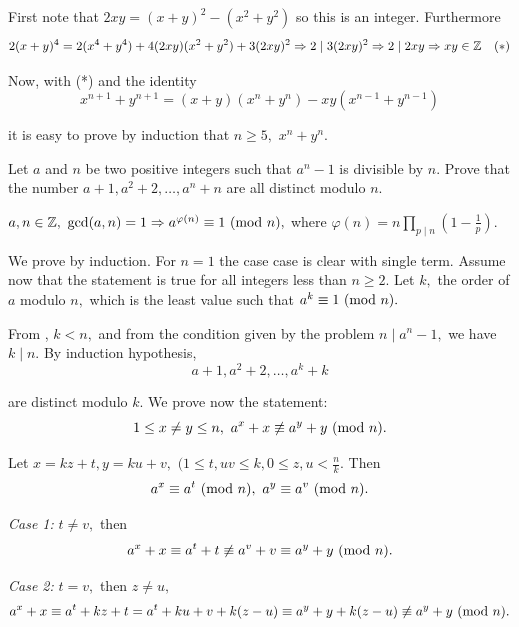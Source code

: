 \documentclass{article}
\begin{document}
\begin{soln}
    First note that $2xy = (x+y)^2 - (x^2+y^2)$ so this is an integer.
    Furthermore
    \[
        2(x+y)^4 = 2(x^4+y^4) + 4(2xy)(x^2+y^2) + 3(2xy)^2 \Rightarrow 2 \mid 3(2xy)^2 \Rightarrow 2 \mid 2xy \Rightarrow xy \in \mathbb Z \quad (*)
    \]

    Now, with (*) and the identity
    \[
        x^{n+1} + y^{n+1} = (x+y)(x^{n} + y^{n}) - xy(x^{n-1} + y^{n-1})
    \]

    it is easy to prove by induction that $n \ge 5,$ $x^n + y^n.$
\end{soln}

\begin{problem}
    Let $a$ and $n$ be two positive integers such that $a^n - 1$ is divisible by $n.$
    Prove that the number $a+1, a^2 + 2, \ldots, a^n+n$ are all distinct modulo $n.$
\end{problem}

\begin{theorem*} 
    \label{theorem:euler-theorem}
    $a,n \in \mathbb Z,\ \gcd(a, n)=1 \Rightarrow a^{\varphi(n)}\equiv 1 \ (\mathrm{mod}\ n),$
    where $\displaystyle \varphi(n) = n \prod_{p \mid n} \left(1 - \frac{1}{p} \right).$
\end{theorem*}

\begin{soln}
    We prove by induction. For $n=1$ the case case is clear with single term.
    Assume now that the statement is true for all integers less than $n \ge 2.$
    Let $k,$ the order of $a$ modulo $n,$ which is the least value such that $a^{k}\equiv 1 \ (\mathrm{mod}\ n).$
    
    From , $k < n,$ and from the condition given by the problem $n \mid a^n - 1,$
    we have $k \mid n.$ By induction hypothesis,
    \[
        a+1, a^2 + 2, \ldots, a^k+k
    \]

    are distinct modulo $k$. We prove now the statement:
    \[
        1 \le x \ne y \le n,\ a^x + x \not \equiv a^y +y \ (\mathrm{mod}\ n).
    \]

    Let $x = kz + t, y= ku+v,$ $(1\le t, uv\le k, 0 \le z, u < \frac{n}{k}.$ Then
    \[
        a^x \equiv a^t \ (\mathrm{mod}\ n),\ a^y \equiv a^v \ (\mathrm{mod}\ n).
    \]
    
    \textit{Case 1:} $t \ne v,$ then 
    \[
        a^x + x \equiv a^t + t \not \equiv a^v + v \equiv a^y + y \ (\mathrm{mod}\ n).
    \]

    \textit{Case 2:} $t=v,$ then $z\ne u,$
    \[
        a^x +x \equiv a^t + kz + t = a^t + ku + v + k(z-u) \equiv a^y + y + k(z-u) \not \equiv a^y + y \ (\mathrm{mod}\ n).
    \]
\end{soln}
\end{document}
